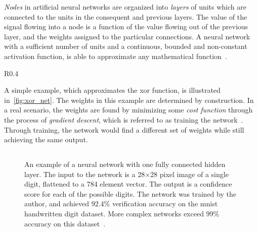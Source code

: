 \documentclass[\rootfolder/main.tex]{subfiles}
\begin{document}
\emph{Nodes} in artificial neural networks are organized into \emph{layers} of units which are connected to the units in the consequent and previous layers.
The value of the signal flowing into a node is a function of the value flowing out of the previous layer, and the weights assigned to the particular connections.
A neural network with a sufficient number of units and a continuous, bounded and non-constant activation function, is able to approximate any mathematical function~\cite{Cybenko1989}\cite{Hornik1991}.

\begin{wrapfigure}{R}{0.4\columnwidth}
    \caption{\acrshort{xor} network, illustrating how neurons can implement basic logic functions.}
    \label{fig:xor_net}
\end{wrapfigure}

A simple example, which approximates the \acrfull{xor} function, is illustrated in~\cref{fig:xor_net}.
The weights in this example are determined by construction.
In a real scenario, the weights are found by minimizing some \emph{cost function} through the process of \emph{gradient descent}, which is referred to as training the network~\cite{Mitchell1997}.
Through training, the network would find a different set of weights while still achieving the same output.


\subsection{}

\begin{figure}
    \caption[An example of a neural network with one fully connected hidden layer.]%
            {An example of a neural network with one fully connected hidden layer. %
            The input to the network is a 28$\times$28 pixel image of a single digit, flattened to a 784 element vector. %
            The output is a confidence score for each of the possible digits. %
            The network was trained by the author, and achieved 92.4\% verification accuracy on the \acrshort{mnist} handwritten digit dataset. %
            More complex networks exceed 99\% accuracy on this dataset~\cite{mnist2010}.}
    \label{fig:mnist-net}
\end{figure}
\end{document}
